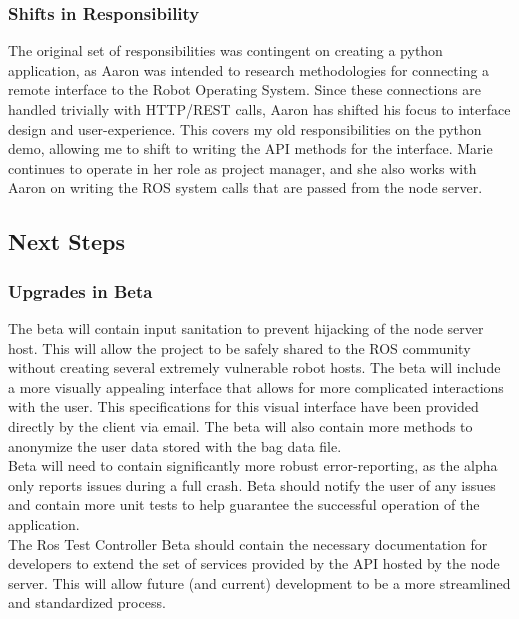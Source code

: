 \documentclass[onecolumn, draftclsnofoot,10pt, compsoc]{IEEEtran}
\begin{document}
\subsubsection{Shifts in Responsibility}
The original set of responsibilities was contingent on creating a python application, as Aaron was intended to research methodologies for connecting a remote interface to the Robot Operating System. Since these connections are handled trivially with HTTP/REST calls, Aaron has shifted his focus to interface design and user-experience. This covers my old responsibilities on the python demo, allowing me to shift to writing the API methods for the interface. Marie continues to operate in her role as project manager, and she also works with Aaron on writing the ROS system calls that are passed from the node server.

\subsection{Next Steps}

\subsubsection{Upgrades in Beta}
The beta will contain input sanitation to prevent hijacking of the node server host. This will allow the project to be safely shared to the ROS community without creating several extremely vulnerable robot hosts. The beta will include a more visually appealing interface that allows for more complicated interactions with the user. This specifications for this visual interface have been provided directly by the client via email. The beta will also contain more methods to anonymize the user data stored with the bag data file.\\
Beta will need to contain significantly more robust error-reporting, as the alpha only reports issues during a full crash. Beta should notify the user of any issues and contain more unit tests to help guarantee the successful operation of the application.\\
The Ros Test Controller Beta should contain the necessary documentation for developers to extend the set of services provided by the API hosted by the node server. This will allow future (and current) development to be a more streamlined and standardized process. 
\end{document}

